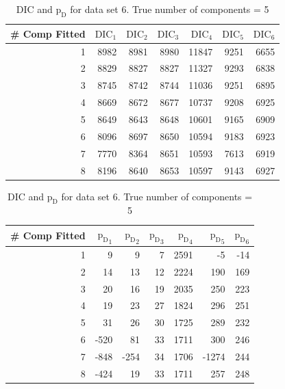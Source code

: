 \begin{table}[!htb]
\centering
\caption{DIC and $\text{p}_\text{D}$ for data set 6. True number of components = 5}
\label{table : ds_5wellsep_dic}
\begin{tabular}{@{}rrrrrrr@{}}
\toprule
\# Comp Fitted & $\text{DIC}_1$ & $\text{DIC}_2$  & $\text{DIC}_3$  & $\text{DIC}_4$  & $\text{DIC}_5$  & $\text{DIC}_6$  \\ \midrule
1 & 8982 & 8981 & 8980 & 11847 & 9251 & 6655 \\
2 & 8829 & 8827 & 8827 & 11327 & 9293 & 6838 \\
3 & 8745 & 8742 & 8744 & 11036 & 9251 & 6895 \\
4 & 8669 & 8672 & 8677 & 10737 & 9208 & 6925 \\
5 & 8649 & 8643 & 8648 & 10601 & 9165 & 6909 \\
6 & 8096 & 8697 & 8650 & 10594 & 9183 & 6923 \\
7 & 7770 & 8364 & 8651 & 10593 & 7613 & 6919 \\
8 & 8196 & 8640 & 8653 & 10597 & 9143 & 6927 \\ \bottomrule
\end{tabular}

\begin{tabular}{@{}rrrrrrr@{}}
\toprule
\# Comp Fitted & ${\text{p}_\text{D}}_1$ & ${\text{p}_\text{D}}_2$ & ${\text{p}_\text{D}}_3$ & ${\text{p}_\text{D}}_4$ & ${\text{p}_\text{D}}_5$ & ${\text{p}_\text{D}}_6$ \\ \midrule
1 & 9 & 9 & 7 & 2591 & -5 & -14 \\
2 & 14 & 13 & 12 & 2224 & 190 & 169 \\
3 & 20 & 16 & 19 & 2035 & 250 & 223 \\
4 & 19 & 23 & 27 & 1824 & 296 & 251 \\
5 & 31 & 26 & 30 & 1725 & 289 & 232 \\
6 & -520 & 81 & 33 & 1711 & 300 & 246 \\
7 & -848 & -254 & 34 & 1706 & -1274 & 244 \\
8 & -424 & 19 & 33 & 1711 & 257 & 248 \\ \bottomrule
\end{tabular}
\end{table}

